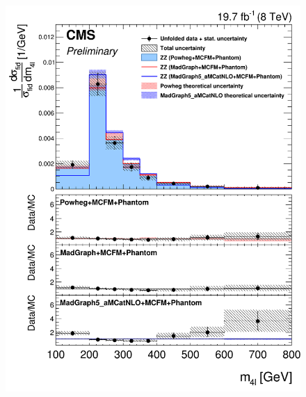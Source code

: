 \begin{figure}[hbtp]
\begin{center}
    \includegraphics[width=\cmsFigWidth]{Figures/DiffCrossSecZZTo2e2mMass_Unfolded_fr_Powheg_norm.png}       

\end{center}
\end{figure}
